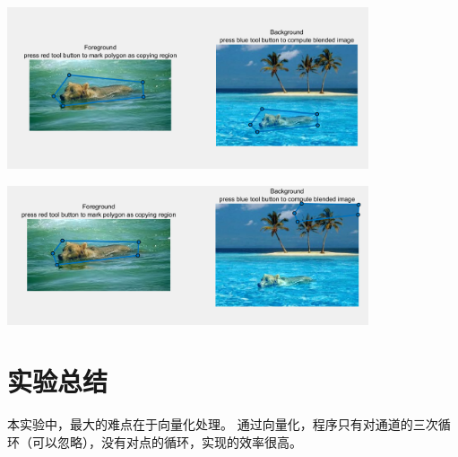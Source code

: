 \documentclass{article}
\begin{document}
\includegraphics[width=0.8\textwidth]{1}

\includegraphics[width=0.8\textwidth]{2}

\section{实验总结}

本实验中，最大的难点在于向量化处理。
通过向量化，程序只有对通道的三次循环（可以忽略），没有对点的循环，实现的效率很高。
\end{document}
